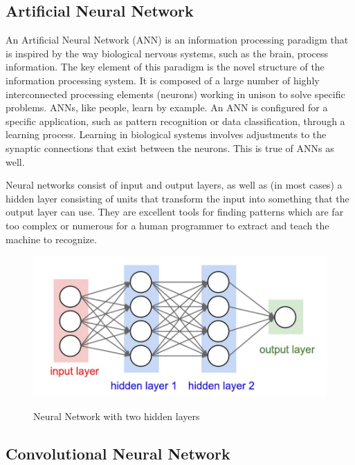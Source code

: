 \subsection{Artificial Neural Network}

An Artificial Neural Network (ANN) is an information processing paradigm that is inspired by the way biological nervous systems, such as the brain, process information. The key element of this paradigm is the novel structure of the information processing system. It is composed of a large number of highly interconnected processing elements (neurons) working in unison to solve specific problems. ANNs, like people, learn by example. An ANN is configured for a specific application, such as pattern recognition or data classification, through a learning process. Learning in biological systems involves adjustments to the synaptic connections that exist between the neurons. This is true of ANNs as well.


Neural networks consist of input and output layers, as well as (in most cases) a hidden layer consisting of units that transform the input into something that the output layer can use. They are excellent tools for finding patterns which are far too complex or numerous for a human programmer to extract and teach the machine to recognize.


\begin{figure}[H]
\begin{center}
\includegraphics[height=.28\textheight]{Chapter2/Figs/TwoLayeredNN.png}
\label{fig:Two Layered Neural_Network}
\caption{Neural Network with two hidden layers \cite{karparthy}}
\end{center}
\end{figure}


\subsection{Convolutional Neural Network}

